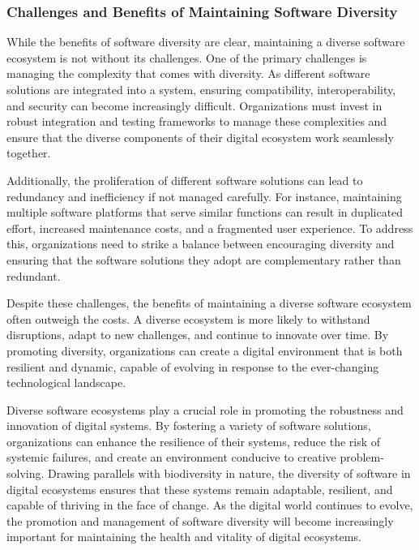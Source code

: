 \documentclass[12pt,twoside]{article}
\begin{document}
\subsubsection{Challenges and Benefits of Maintaining Software Diversity}

While the benefits of software diversity are clear, maintaining a diverse software ecosystem is not without its challenges. One of the primary challenges is managing the complexity that comes with diversity. As different software solutions are integrated into a system, ensuring compatibility, interoperability, and security can become increasingly difficult. Organizations must invest in robust integration and testing frameworks to manage these complexities and ensure that the diverse components of their digital ecosystem work seamlessly together.

Additionally, the proliferation of different software solutions can lead to redundancy and inefficiency if not managed carefully. For instance, maintaining multiple software platforms that serve similar functions can result in duplicated effort, increased maintenance costs, and a fragmented user experience. To address this, organizations need to strike a balance between encouraging diversity and ensuring that the software solutions they adopt are complementary rather than redundant.

Despite these challenges, the benefits of maintaining a diverse software ecosystem often outweigh the costs. A diverse ecosystem is more likely to withstand disruptions, adapt to new challenges, and continue to innovate over time. By promoting diversity, organizations can create a digital environment that is both resilient and dynamic, capable of evolving in response to the ever-changing technological landscape.

Diverse software ecosystems play a crucial role in promoting the robustness and innovation of digital systems. By fostering a variety of software solutions, organizations can enhance the resilience of their systems, reduce the risk of systemic failures, and create an environment conducive to creative problem-solving. Drawing parallels with biodiversity in nature, the diversity of software in digital ecosystems ensures that these systems remain adaptable, resilient, and capable of thriving in the face of change. As the digital world continues to evolve, the promotion and management of software diversity will become increasingly important for maintaining the health and vitality of digital ecosystems.
\end{document}
